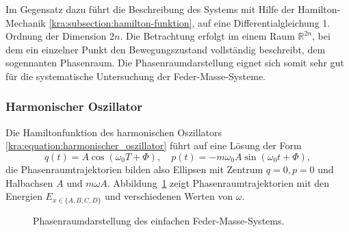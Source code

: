 Im Gegensatz dazu führt die Beschreibung des Systems mit Hilfe der Hamilton-Mechanik \ref{kra:subsection:hamilton-funktion}, auf eine Differentialgleichung 1. Ordnung der Dimension $2n$.
Die Betrachtung erfolgt im einem Raum $\mathbb{R}^{2n}$, bei dem ein einzelner Punkt den Bewegungszustand vollständig beschreibt, dem sogennanten Phasenraum.
Die Phasenraumdarstellung eignet sich somit sehr gut für die systematische Untersuchung der Feder-Masse-Systeme.

\subsubsection{Harmonischer Oszillator}
Die Hamiltonfunktion des harmonischen Oszillators \eqref{kra:equation:harmonischer_oszillator} führt auf eine Lösung der Form
\begin{equation*}
    q(t) = A \cos(\omega_0 T + \Phi), \quad p(t) = -m \omega_0 A \sin(\omega_0 t + \Phi),
\end{equation*}
die Phasenraumtrajektorien bilden also Ellipsen mit Zentrum $q=0, p=0$ und Halbachsen $A$ und $m \omega A$.
Abbildung~\ref{kra:fig:phasenraum} zeigt Phasenraumtrajektorien mit den Energien $E_{x \in \{A, B, C, D\}}$ und verschiedenen Werten von $\omega$.
\begin{figure}
    \centering
    
    \caption{Phasenraumdarstellung des einfachen Feder-Masse-Systems.}
    \label{kra:fig:phasenraum}
\end{figure}

